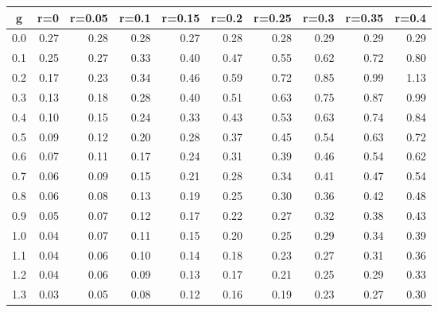 %
\begin{table}[!tbp]
 \begin{center}
 \begin{tabular}{rrrrrrrrrr}\hline\hline
\multicolumn{1}{c}{g}&\multicolumn{1}{c}{r=0}&\multicolumn{1}{c}{r=0.05}&\multicolumn{1}{c}{r=0.1}&\multicolumn{1}{c}{r=0.15}&\multicolumn{1}{c}{r=0.2}&\multicolumn{1}{c}{r=0.25}&\multicolumn{1}{c}{r=0.3}&\multicolumn{1}{c}{r=0.35}&\multicolumn{1}{c}{r=0.4}\tabularnewline
\hline
0.0&0.27&0.28&0.28&0.27&0.28&0.28&0.29&0.29&0.29\tabularnewline
0.1&0.25&0.27&0.33&0.40&0.47&0.55&0.62&0.72&0.80\tabularnewline
0.2&0.17&0.23&0.34&0.46&0.59&0.72&0.85&0.99&1.13\tabularnewline
0.3&0.13&0.18&0.28&0.40&0.51&0.63&0.75&0.87&0.99\tabularnewline
0.4&0.10&0.15&0.24&0.33&0.43&0.53&0.63&0.74&0.84\tabularnewline
0.5&0.09&0.12&0.20&0.28&0.37&0.45&0.54&0.63&0.72\tabularnewline
0.6&0.07&0.11&0.17&0.24&0.31&0.39&0.46&0.54&0.62\tabularnewline
0.7&0.06&0.09&0.15&0.21&0.28&0.34&0.41&0.47&0.54\tabularnewline
0.8&0.06&0.08&0.13&0.19&0.25&0.30&0.36&0.42&0.48\tabularnewline
0.9&0.05&0.07&0.12&0.17&0.22&0.27&0.32&0.38&0.43\tabularnewline
1.0&0.04&0.07&0.11&0.15&0.20&0.25&0.29&0.34&0.39\tabularnewline
1.1&0.04&0.06&0.10&0.14&0.18&0.23&0.27&0.31&0.36\tabularnewline
1.2&0.04&0.06&0.09&0.13&0.17&0.21&0.25&0.29&0.33\tabularnewline
1.3&0.03&0.05&0.08&0.12&0.16&0.19&0.23&0.27&0.30\tabularnewline
\hline
\end{tabular}

\end{center}

\end{table}

